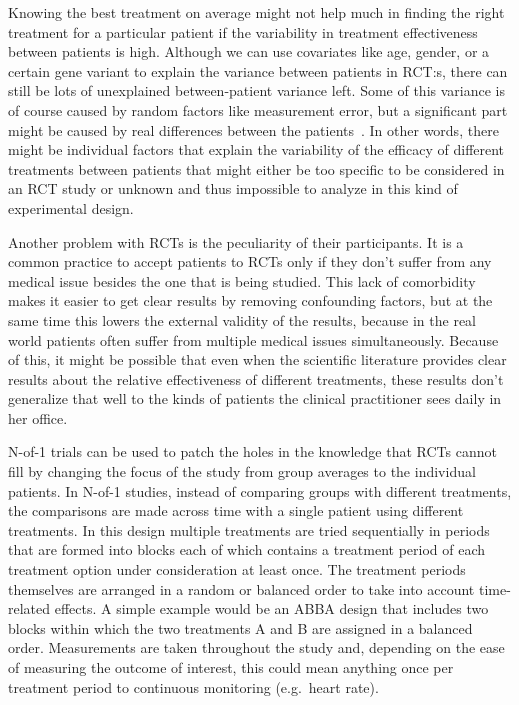 \documentclass[12pt,a4paper,leqno]{report}
\theoremstyle{plain}
\theoremstyle{definition}
\theoremstyle{remark}
\begin{document}
Knowing the best treatment on average might not help much in finding the right
treatment for a particular patient if the variability in treatment effectiveness
between patients is high. Although we can use covariates like age, gender, or
a certain gene variant to explain the variance between patients in RCT:s, there
can still be lots of unexplained between-patient variance left. Some
of this variance is of course caused by random factors like measurement error,
but a significant part might be caused by real differences between the patients\ \cite{HTE1, HTE2, HTE3, HTE4}.
In other words, there might be individual factors that explain the variability
of the efficacy of different treatments between patients that might either be
too specific to be considered in an RCT study or unknown and thus impossible to
analyze in this kind of experimental design.

Another problem with RCTs is the peculiarity of their participants. It is
a common practice to accept patients to RCTs only if they don't suffer from any
medical issue besides the one that is being studied. This lack of comorbidity
makes it easier to get clear results by removing confounding factors, but at the
same time this lowers the external validity of the results, because in the real
world patients often suffer from multiple medical issues simultaneously. Because of this, it might be possible that even when the scientific
literature provides clear results about the relative effectiveness of different
treatments, these results don't generalize that well to the kinds of
patients the clinical practitioner sees daily in her office.\ \cite{HTE1}

N-of-1 trials can be used to patch the holes in the knowledge that RCTs cannot
fill by changing the focus of the study from group averages to the individual
patients. In N-of-1 studies, instead of comparing groups with different treatments,
the comparisons are made across time with a single patient using different
treatments. In this design multiple treatments are tried sequentially in periods
that are formed into blocks each of which contains a treatment period of each
treatment option under consideration at least once. The treatment periods themselves are
arranged in a random or balanced order to take
into account time-related effects. A simple example would be an ABBA design that
includes two blocks within which the two treatments A and B are assigned in a
balanced order. Measurements are taken throughout the study and, depending on the
ease of measuring the outcome of interest, this could mean anything
once per treatment period to continuous monitoring (e.g.\ heart rate).
\end{document}
